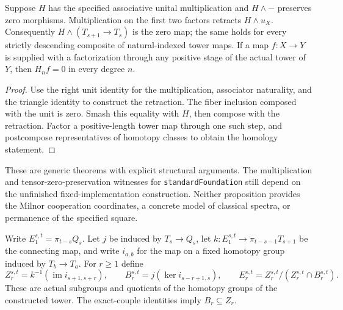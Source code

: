 \begin{proposition}
  \label{prop:h6-tower-homology-zero}
  \leanok
  Suppose $H$ has the specified associative unital multiplication and
  $H\wedge-$ preserves zero morphisms. Multiplication on the first two
  factors retracts $H\wedge u_X$. Consequently $H\wedge(T_{s+1}\to T_s)$
  is the zero map; the same holds for every strictly descending composite
  of natural-indexed tower maps. If a map $f:X\to Y$ is supplied with a
  factorization through any positive stage of the actual tower of $Y$,
  then $H_nf=0$ in every degree $n$.
\end{proposition}
\begin{proof}
  Use the right unit identity for the multiplication, associator naturality,
  and the triangle identity to construct the retraction. The fiber inclusion
  composed with the unit is zero. Smash this equality with $H$, then compose
  with the retraction. Factor a positive-length tower map through one such
  step, and postcompose representatives of homotopy classes to obtain the
  homology statement.
  \leanok
\end{proof}

These are generic theorems with explicit structural arguments. The
multiplication and tensor-zero-preservation witnesses for
\texttt{standardFoundation} still depend on the unfinished fixed-implementation
construction. Neither proposition provides the Milnor
cooperation coordinates, a concrete model of classical spectra, or permanence
of the specified square.

\begin{definition}
  \label{def:h6-tower-pages}
  \leanok
  Write $E_1^{s,t}=\pi_{t-s}Q_s$.  Let $j$ be induced by $T_s\to Q_s$,
  let $k:E_1^{s,t}\to\pi_{t-s-1}T_{s+1}$ be the connecting map, and
  write $i_{a,b}$ for the map on a fixed homotopy group induced by
  $T_b\to T_a$.  For $r\ge1$ define
  \[
    Z_r^{s,t}=k^{-1}(\operatorname{im}i_{s+1,s+r}),\qquad
    B_r^{s,t}=j(\ker i_{s-r+1,s}),\qquad
    E_r^{s,t}=Z_r^{s,t}/(Z_r^{s,t}\cap B_r^{s,t}).
  \]
  These are actual subgroups and quotients of the homotopy groups of the
  constructed tower.  The exact-couple identities imply $B_r\subseteq Z_r$.
\end{definition}


